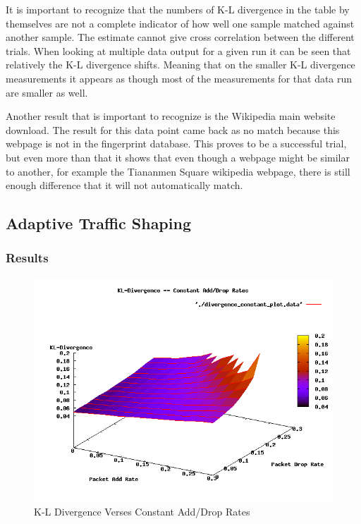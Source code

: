 \documentclass{article}
\begin{document}
It is important to recognize that the numbers of K-L divergence in the table 
by themselves are not a complete indicator of how well one sample matched 
against another sample. The estimate cannot give cross correlation between 
the different trials. When looking at 
multiple data output for a given run it can be seen that relatively the K-L
divergence shifts. Meaning that on the smaller K-L divergence measurements
it appears as though most of the measurements for that data run are smaller 
as well.

Another result that is important to recognize is the Wikipedia main website
download. The result for this data point came back as no match because 
this webpage is not in the fingerprint database. This proves to be a successful
trial, but even more than that it shows that even though a webpage might be 
similar to another, for example the Tiananmen Square wikipedia webpage, there
is still enough difference that it will not automatically match. 

\subsection{Adaptive Traffic Shaping}

\subsubsection{Results}
\begin{figure}
	\centering
		\includegraphics[scale=0.5]{./plots/divergence_constant_plot.png}
	\caption{K-L Divergence Verses Constant Add/Drop Rates}
	\label{fig:divplot}
\end{figure}
\end{document}
